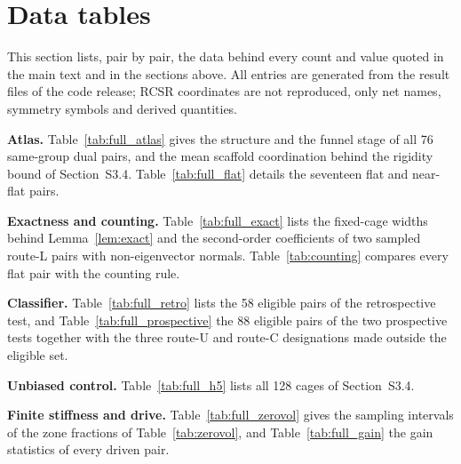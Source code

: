 \section{Data tables}\label{sec:data}

This section lists, pair by pair, the data behind every count and value quoted in the main text and in the sections above. All entries are generated from the result files of the code release; RCSR coordinates are not reproduced, only net names, symmetry symbols and derived quantities.

\textbf{Atlas.} Table~\ref{tab:full_atlas} gives the structure and the funnel stage of all 76 same-group dual pairs, and the mean scaffold coordination behind the rigidity bound of Section~S3.4. Table~\ref{tab:full_flat} details the seventeen flat and near-flat pairs.





\textbf{Exactness and counting.} Table~\ref{tab:full_exact} lists the fixed-cage widths behind Lemma~\ref{lem:exact} and the second-order coefficients of two sampled route-L pairs with non-eigenvector normals. Table~\ref{tab:counting} compares every flat pair with the counting rule.





\textbf{Classifier.} Table~\ref{tab:full_retro} lists the 58 eligible pairs of the retrospective test, and Table~\ref{tab:full_prospective} the 88 eligible pairs of the two prospective tests together with the three route-U and route-C designations made outside the eligible set.





\textbf{Unbiased control.} Table~\ref{tab:full_h5} lists all 128 cages of Section~S3.4.



\textbf{Finite stiffness and drive.} Table~\ref{tab:full_zerovol} gives the sampling intervals of the zone fractions of Table~\ref{tab:zerovol}, and Table~\ref{tab:full_gain} the gain statistics of every driven pair.




